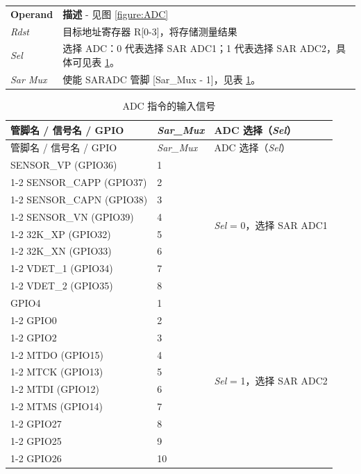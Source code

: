 \documentclass[main\_\_CN.tex]{subfiles}
\begin{document}
\begin{tabular}{ l l }
\textbf{Operand} & \textbf{描述} - 见图 \ref{figure:ADC} \\
\textit{Rdst} & 目标地址寄存器 R[0-3]，将存储测量结果\\
\textit{Sel} & 选择 ADC：0 代表选择 SAR ADC1；1 代表选择 SAR ADC2，具体可见表 \ref{table:adc inputs1}。 \\
\textit{Sar Mux} & 使能 SARADC 管脚 [Sar\_Mux - 1]，见表 \ref{table:adc inputs1}。 \\
\end{tabular}

\begin{longtable}{ |p{7cm}|p{3cm}|p{4cm}| }
    \caption{ADC 指令的输入信号}
    \label{table:adc inputs1}
    \\\hline
    \rowcolor{lightgray}
    管脚名 / 信号名 / GPIO \ & \textit{Sar\_Mux} & ADC 选择（\textit{Sel}） \\\hline
    \endfirsthead
    \hline
    \rowcolor{lightgray}
    管脚名 / 信号名 / GPIO \ & \textit{Sar\_Mux} & ADC 选择（\textit{Sel}） \\\hline
    \endhead
    \hline
    \endfoot
    SENSOR\_VP (GPIO36)    &  1  & \multirow{8}{*}{\textit{Sel} = 0，选择 SAR ADC1} \\ \cline{1-2}
    SENSOR\_CAPP (GPIO37)  &  2  & \\ \cline{1-2}
    SENSOR\_CAPN (GPIO38)  &  3  & \\ \cline{1-2}
    SENSOR\_VN (GPIO39)    &  4  & \\ \cline{1-2}
    32K\_XP (GPIO32)       &  5  & \\ \cline{1-2}
    32K\_XN (GPIO33)       &  6  & \\ \cline{1-2}
    VDET\_1 (GPIO34)       &  7  & \\ \cline{1-2}
    VDET\_2 (GPIO35)       &  8  & \\ \hline
    GPIO4                  &  1  & \multirow{10}{*}{\textit{Sel} = 1，选择 SAR ADC2 } \\ \cline{1-2}
    GPIO0                  &  2  & \\ \cline{1-2}
    GPIO2                  &  3  & \\ \cline{1-2}
    MTDO (GPIO15)          &  4  & \\ \cline{1-2}
    MTCK (GPIO13)          &  5  & \\ \cline{1-2}
    MTDI (GPIO12)          &  6  & \\ \cline{1-2}
    MTMS (GPIO14)          &  7  & \\ \cline{1-2}
    GPIO27                 &  8  & \\ \cline{1-2}
    GPIO25                 &  9  & \\ \cline{1-2}
    GPIO26                 &  10  &
\end{longtable}
\end{document}
